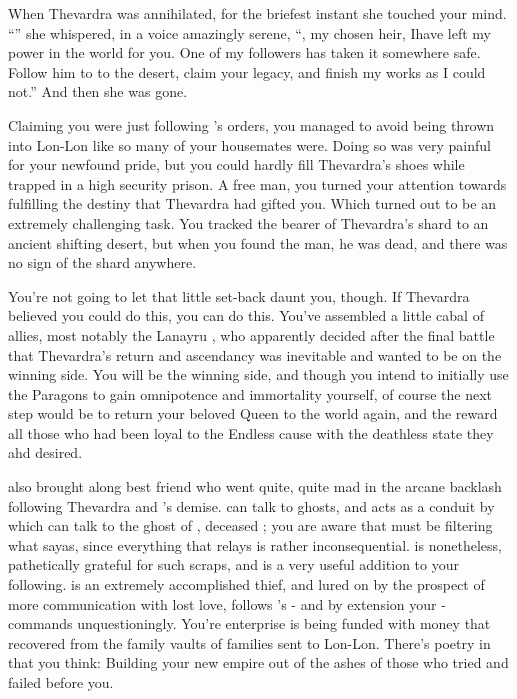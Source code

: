 \documentclass[char]{Katmeers}
\begin{document}
When Thevardra was annihilated, for the briefest instant she touched your mind. ``\cGoyle{\formal}'' she whispered, in a voice amazingly serene, ``\cGoyle{\formal}, my chosen heir, Ihave left my power in the world for you. One of my followers has taken it somewhere safe. Follow him to to the desert, claim your legacy, and finish my works as I could not.'' And then she was gone.

Claiming you were just following \cMalfoy{\formal}'s orders, you managed to avoid being thrown into Lon-Lon like so many of your housemates were. Doing so was very painful for your newfound pride, but you could hardly fill Thevardra's shoes while trapped in a high security prison. A free man, you turned your attention towards fulfilling the destiny that Thevardra had gifted you. Which turned out to be an extremely challenging task. You tracked the bearer of Thevardra's shard to an ancient shifting desert, but when you found the man, he was dead, and there was no sign of the shard anywhere.

You're not going to let that little set-back daunt you, though. If Thevardra believed you could do this, you can do this. You've assembled a little cabal of allies, most notably the Lanayru \cCrabbe{}, who apparently decided after the final battle that Thevardra's return and ascendancy was inevitable and \cCrabbe{\they} wanted to be on the winning side. You will be the winning side, and though you intend to initially use the Paragons to gain omnipotence and immortality yourself, of course the next step would be to return your beloved Queen to the world again, and the reward all those who had been loyal to the Endless cause with the deathless state they ahd desired.

\cCrabbe{} also brought along \cCrabbe{\their} best friend \cGinny{} who went quite, quite mad in the arcane backlash following Thevardra and \cHarry{}'s demise. \cCrabbe{} can talk to ghosts, and acts as a conduit by which \cGinny{} can talk to the ghost of \cHarry{}, \cGinny{\their} deceased \cHarry{\significant}; you are aware that \cCrabbe{} must be filtering what \cHarry{} sayas, since everything that \cCrabbe{} relays is rather inconsequential. \cGinny{} is nonetheless, pathetically grateful for such scraps, and \cGinny{} is a very useful addition to your following. \cGinny{\They} is an extremely accomplished thief, and lured on by the prospect of more communication with \cGinny{\their} lost love, \cGinny{\they} follows \cCrabbe{}'s - and by extension your - commands unquestioningly. You're enterprise is being funded with money that \cGinny{} recovered from the family vaults of families sent to Lon-Lon. There's poetry in that you think: Building your new empire out of the ashes of those who tried and failed before you.
\end{document}
